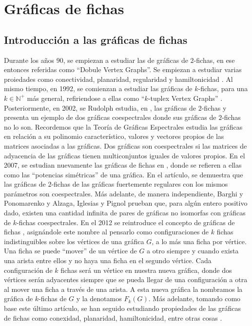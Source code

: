 \chapter{Gr\'aficas de fichas}%
\label{cap:fichass}

\section{Introducci\'on a las gr\'aficas de fichas}%
\label{sec:intro-fichas}


    Durante los a\~{n}os 90, se empiezan a estudiar las de gr\'aficas de
$2$-fichas, en ese entonces referidas como ``Dobule Vertex Graphs''. Se empiezan
a estudiar varias proiedades como conectividad, planaridad, regularidad y
hamiltonicidad \cite{alaviPlanarity, alaviDVGraphs, alaviHamilt, zhuConnect}. Al
mismo tiempo, en 1992, se comienzan a estudiar las gr\'aficas de $k$-fichas,
para una $k \in \mathbb{N^{+}}$ m\'as general, refiriendose a ellas como
``$k$-tuplex Vertex Graphs'' \cite{zhuNTuples}. Posteriormente, en 2002, se
Rudolph estudia, en \cite{rudolphGInv}, las gr\'aficas de $2$-fichas y presenta
un ejemplo de dos gr\'aficas coespectrales donde sus gr\'aficas de $2$-fichas no
lo son. Recordemos que la Teor\'ia de Gr\'aficas Espectrales estudia las
gr\'aficas en relaci\'on a su polinomio caracter\'istico, valores y vectores
propios de las matrices asociadas a las gr\'aficas. Dos gr\'aficas son
coespectrales si las matrices de adyacencia de las gr\'aficas tienen
multiconjuntos iguales de valores propios. En el 2007, se estudian nuevamente
las gr\'aficas de fichas en \cite{audeanetSymPower}, donde se refieren a ellas
como las ``potencias sim\'etricas'' de una gr\'afica. En el art\'iculo, se
demuestra que las gr\'aficas de $2$-fichas de las gr\'aficas fuertemente
regulares con los mismos par\'ametros son coespectrales. M\'as adelante, de
manera independiente, Barghi y Ponomarenko \cite{barghi-ponomarenko} y Alzaga,
Iglesias y Pignol \cite{alzagaSymPower} prueban que, para alg\'un entero
positivo dado, existen una cantidad infinita de pares de gr\'aficas no isomorfas
con gr\'aficas de $k$-fichas coespectrales. En el 2012 se reintroduce el
concepto de gr\'aficas de fichas \cite{fabilaToken}, asign\'andole este nombre
al pensarlo como configuraciones de $k$ fichas indistinguibles sobre los
v\'ertices de una gr\'afica $G$, a lo m\'as una ficha por v\'ertice. Una ficha
se puede ``mover'' de un v\'ertice de $G$ a otro siempre y cuando exista una
arista entre ellos y no haya una ficha en el segundo v\'ertice. Cada
configuraci\'on de $k$ fichas ser\'a un v\'ertice en nuestra nueva gr\'afica,
donde dos v\'ertices ser\'an adyacentes siempre que se pueda llegar de una
configuraci\'on a otra al mover una ficha a trav\'es de una arista. A esta nueva
gr\'afica la nombramos la gr\'afica de $k$-fichas de $G$ y la denotamos
$F_k(G)$. M\'as adelante, tomando como base este \'ultimo art\'iculo, se han
seguido estudiando propiedades de las gr\'aficas de fichas como conexidad,
planaridad, hamiltonicidad, entre otras cosas \cite{carballosaRegPlan,
leaConnect, riveraHamilt, adameHamilt, leaEConnect}.


